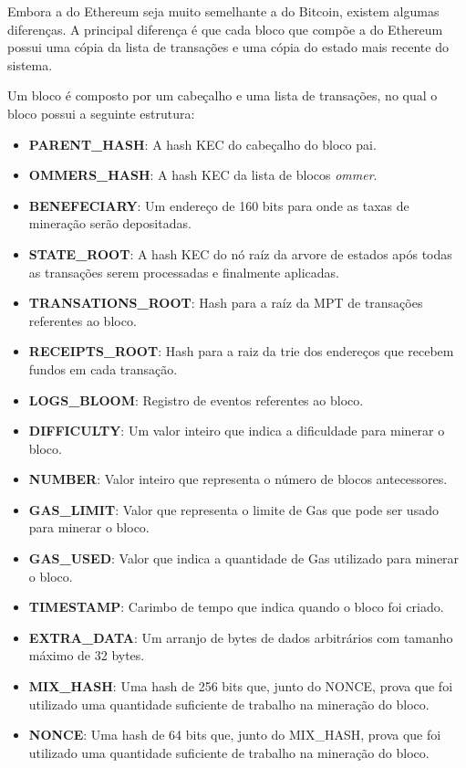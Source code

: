 \documentclass[tcc,capa]{texufpel}
\begin{document}
	Embora a \bchain do Ethereum seja muito semelhante a \bchain do Bitcoin, existem algumas diferenças. A principal diferença é que cada bloco que compõe a \bchain do Ethereum possui uma cópia da lista de transações e uma cópia do estado mais recente do sistema.
	
	Um bloco é composto por um cabeçalho e uma lista de transações, no qual o bloco possui a seguinte estrutura:
	
	\begin{itemize}
	    \item \textbf{PARENT\_HASH}: A hash KEC do cabeçalho do bloco pai.
	    \item \textbf{OMMERS\_HASH}: A hash KEC da lista de blocos \textit{ommer}.
	    \item \textbf{BENEFECIARY}: Um endereço de 160 bits para onde as taxas de mineração serão depositadas.
	    \item \textbf{STATE\_ROOT}: A hash KEC do nó raíz da arvore de estados após todas as transações serem processadas e finalmente aplicadas.
	    \item \textbf{TRANSATIONS\_ROOT}: Hash para a raíz da MPT de transações referentes ao bloco.
	    \item \textbf{RECEIPTS\_ROOT}: Hash para a raiz da trie dos endereços que recebem fundos em cada transação.
	    \item \textbf{LOGS\_BLOOM}: Registro de eventos referentes ao bloco.
	    \item \textbf{DIFFICULTY}: Um valor inteiro que indica a dificuldade para minerar o bloco.
	    \item \textbf{NUMBER}: Valor inteiro que representa o número de blocos antecessores.
	    \item \textbf{GAS\_LIMIT}: Valor que representa o limite de Gas que pode ser usado para minerar o bloco.
	    \item \textbf{GAS\_USED}: Valor que indica a quantidade de Gas utilizado para minerar o bloco.
	    \item \textbf{TIMESTAMP}: Carimbo de tempo que indica quando o bloco foi criado.
	    \item \textbf{EXTRA\_DATA}: Um arranjo de bytes de dados arbitrários com tamanho máximo de 32 bytes.
	    \item \textbf{MIX\_HASH}: Uma hash de 256 bits que, junto do NONCE, prova que foi utilizado uma quantidade suficiente de trabalho na mineração do bloco.
	    \item \textbf{NONCE}: Uma hash de 64 bits que, junto do MIX\_HASH, prova que foi utilizado uma quantidade suficiente de trabalho na mineração do bloco.
	\end{itemize}
	
\end{document}
